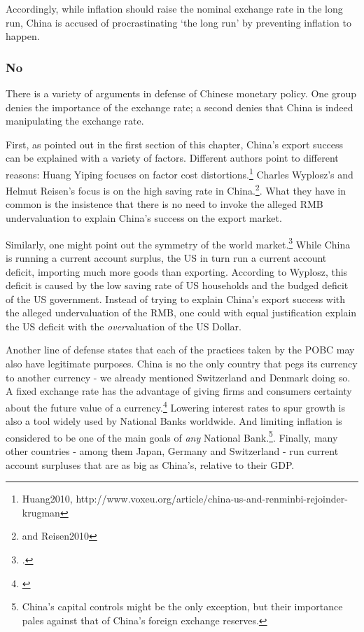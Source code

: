 Accordingly, while inflation should raise the nominal exchange rate in the long run, China is accused of procrastinating `the long run' by preventing inflation to happen.

\subsubsection{No}

There is a variety of arguments in defense of Chinese monetary policy. One group denies the importance of the exchange rate; a second denies that China is indeed manipulating the exchange rate.

First, as pointed out in the first section of this chapter, China's export success can be explained with a variety of factors.  Different authors point to different reasons: Huang Yiping focuses on factor cost distortions.\footnote{Huang2010, http://www.voxeu.org/article/china-us-and-renminbi-rejoinder-krugman} Charles Wyplosz's and Helmut Reisen's focus is on the high saving rate in China.\footnote{\cite[pp. 40]{Wyplosz2010} and \cite{p. 65}{Reisen2010}}. What they have in common is the insistence that there is no need to invoke the alleged RMB undervaluation to explain China's success on the export market.

Similarly, one might point out the symmetry of the world market.\footnote{\cite[pp. 39-40]{Wyplosz2010}.} While China is running a current account surplus, the US in turn run a current account deficit, importing much more goods than exporting. According to Wyplosz, this deficit is caused by the low saving rate of US households and the budged deficit of the US government. Instead of trying to explain China's export success with the alleged undervaluation of the RMB, one could with equal justification explain the US deficit with the \emph{over}valuation of the US Dollar. 

Another line of defense states that each of the practices taken by the POBC may also have legitimate purposes. China is no the only country that pegs its currency to another currency - we already mentioned Switzerland and Denmark doing so. A fixed exchange rate has the advantage of giving firms and consumers certainty about the future value of a currency.\footnote{\cite[p. 515]{Krugman2008}} Lowering interest rates to spur growth is also a tool widely used by National Banks worldwide. And limiting inflation is considered to be one of the main goals of \emph{any} National Bank.\footnote{China's capital controls might be the only exception, but their importance pales against that of China's foreign exchange reserves.}. Finally, many other countries - among them Japan, Germany and Switzerland - run current account surpluses that are as big as China's, relative to their GDP.

